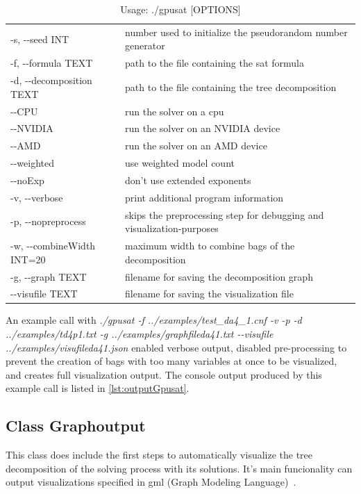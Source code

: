 \documentclass[a4paper, 12pt, bibliography=totoc]{scrartcl}
\begin{document}
\begin{longtable}{ll}
	\caption{Usage: ./gpusat [OPTIONS]
		\label{tab:optionsgpusat}}\\
	\hline
	\vspace{0.5ex}
	\endfirsthead
-s, -{}-seed INT&  number used to initialize the pseudorandom number generator\\
	-f, -{}-formula TEXT &  path to the file containing the sat formula\\
	-d, -{}-decomposition TEXT  &   path to the file containing the tree decomposition\\
	-{}-CPU                   &    run the solver on a cpu\\
	-{}-NVIDIA                &    run the solver on an NVIDIA device\\
	-{}-AMD                   &    run the solver on an AMD device\\
	-{}-weighted              &   use weighted model count\\
	-{}-noExp                 &    don't use extended exponents\\
	-v, -{}-verbose            &    print additional program information\\
	-p, -{}-nopreprocess       &    skips the preprocessing step for debugging and visualization-purposes\\
	-w, -{}-combineWidth INT=20&    maximum width to combine bags of the decomposition\\
	-g, -{}-graph TEXT         &    filename for saving the decomposition graph\\
	-{}-visufile TEXT         &    filename for saving the visualization file\\

\end{longtable}      
        
An example call with \textit{./gpusat -f ../examples/test\_da4\_1.cnf -v -p -d ../examples/td4p1.txt  -g ../examples/graphfileda41.txt -{}-visufile ../examples/visufileda41.json} enabled verbose output, disabled pre-processing to prevent the creation of bags with too many variables at once to be visualized, and creates full visualization output. 
The console output produced by this example call is listed in \ref{lst:outputGpusat}.

\subsection{Class Graphoutput}\label{chagraphoutput}
This class does include the first steps to automatically visualize the tree decomposition of the solving process with its solutions.
It's main funcionality can output visualizations specified in gml (Graph Modeling Language)~\cite{Himsolt2010GMLAP}.
\end{document}
